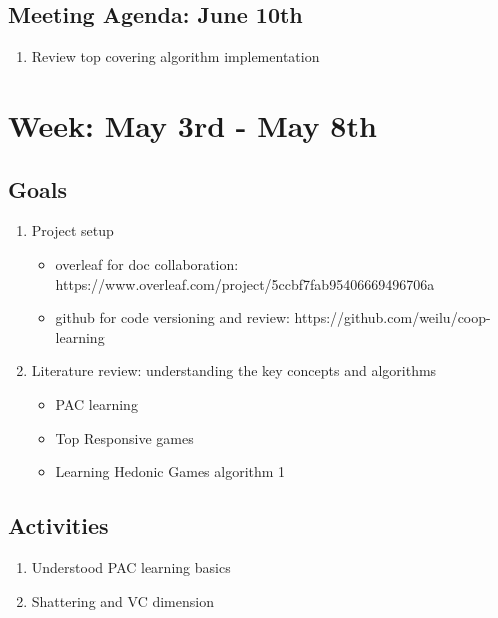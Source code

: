 \documentclass[a4paper]{article}
\begin{document}
\subsection*{Meeting Agenda: June 10th}

\begin{enumerate}
  \item Review top covering algorithm implementation
\end{enumerate}

\section*{Week: May 3rd - May 8th}

\subsection*{Goals}

\begin{enumerate}
  \item Project setup
  \begin{itemize}
    \item overleaf for doc collaboration: https://www.overleaf.com/project/5ccbf7fab95406669496706a
    \item github for code versioning and review: https://github.com/weilu/coop-learning
  \end{itemize}

  \item Literature review: understanding the key concepts and algorithms
  \begin{itemize}
    \item PAC learning
    \item Top Responsive games
    \item Learning Hedonic Games \cite{ijcai2017-380} algorithm 1
  \end{itemize}

\end{enumerate}

\subsection*{Activities}

\begin{enumerate}
  \item Understood PAC learning basics \cite{Valiant:1984:TL:1968.1972}
  \item Shattering and VC dimension \cite{vc}
\end{enumerate}
\end{document}
